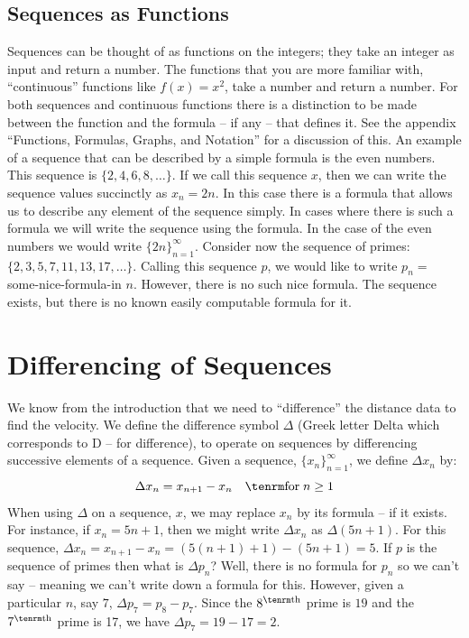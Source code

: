 \subsection{Sequences as Functions}
Sequences can be thought of as functions on the integers; they take an integer as input and return a number.
The functions that you are more familiar with, ``continuous'' functions like $f(x) = x^2$, take a number and return a number.
For both sequences and continuous functions there is a distinction to be made between the function and the formula -- if any --
that defines it. See the appendix ``Functions, Formulas, Graphs, and Notation'' for a discussion of this. 
An example of a sequence that can be described by a simple formula is the even numbers. This sequence is
$\{ 2,4,6,8,\ldots\}$. If we call this sequence $x$, then we can write the sequence values succinctly as $x_n = 2 n$.
In this case there is a formula that allows us to describe any element of the sequence simply. In cases where there is such 
a formula we will write the sequence using the formula. In the case of the even numbers we would write 
$\{2 n\}_{n=1}^{\infty}$. Consider now the sequence of primes: $\{ 2,3,5,7,11,13,17,\ldots\}$.
Calling this sequence $p$, we would like to write $p_n = $ some-nice-formula-in $n$. However, there is no such nice
formula. The sequence exists, but there is no known easily computable formula for it.


\section{Differencing of Sequences}
We know from the introduction that we need to ``difference'' the distance data 
to find the velocity. We define the difference symbol $\Delta$ 
(Greek letter Delta which corresponds to D -- for difference), 
to operate on sequences by differencing successive elements of a sequence.
Given a sequence, $\{x_n\}_{n=1}^{\infty}$, we define $\Delta x_n$ by:
$$
\Delta x_n = x_{n+1} - x_n \quad {\rm for} \; n \ge 1
$$
When using $\Delta$ on a sequence, $x$,  we may replace $x_n$ by its formula -- if it exists.
For instance, if $x_n = 5n+1$, then we might write $\Delta x_n$ as $\Delta (5n+1)$.
For this sequence, $\Delta x_n = x_{n+1} - x_n = (5(n+1) + 1) - (5n+1) = 5$.
If $p$ is the sequence of primes then what is $\Delta p_n$? Well, there is no formula for $p_n$ so we 
can't say -- meaning we can't write down a formula for this. However, given a particular $n$, say $7$, $\Delta p_7 = p_8 -
p_7$. Since the $8^{\rm th}$ prime is $19$ and the $7^{\rm th}$ prime is 17, we have 
$\Delta p_7 = 19 - 17 = 2$.

